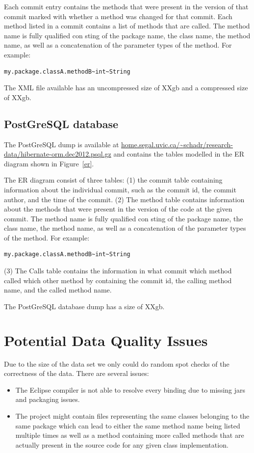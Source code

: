\documentclass[conference]{IEEEtran}
\begin{document}
Each commit entry contains the methods that were present in the version of that commit marked with whether a method was changed for that commit.
Each method listed in a commit contains a list of methods that are called.
The method name is fully qualified con sting of the package name, the class name, the method name, as well as a concatenation of the parameter types of the method.
For example:
\begin{lstlisting}
my.package.classA.methodB~int~String
\end{lstlisting}

The XML file available has an uncompressed size of XXgb and a compressed size of XXgb.

\subsection{PostGreSQL database}
The PostGreSQL dump is available at 
\url{home.segal.uvic.ca/~schadr/research-data/hibernate-orm.dec2012.psql.gz} and contains the tables modelled in the ER diagram shown in Figure~\ref{er}.

The ER diagram consist of three tables: 
(1) the commit table containing information about the individual commit, such as the commit id, the commit author, and the time of the commit.
(2) The method table contains information about the methods that were present in the version of the code at the given commit.
The method name is fully qualified con sting of the package name, the class name, the method name, as well as a concatenation of the parameter types of the method.
For example:
\begin{lstlisting}
my.package.classA.methodB~int~String
\end{lstlisting}
(3) The Calls table contains the information in what commit which method called which other method by containing the commit id, the calling method name, and the called method name.

The PostGreSQL database dump has a size of XXgb.


\section{Potential Data Quality Issues}
\label{sec:issue}
Due to the size of the data set we only could do random spot checks of the correctness of the data.
There are several issues:
\begin{itemize}
\item The Eclipse compiler is not able to resolve every binding due to missing jars and packaging issues.
\item The project might contain files representing the same classes belonging to the same package which can lead to either the same method name being listed multiple times as well as a method containing more called methods that are actually present in the source code for any given class implementation.
\end{itemize}
\end{document}
